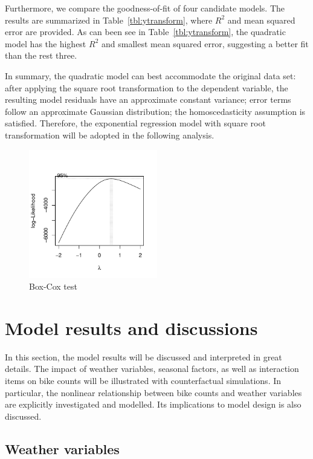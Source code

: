 \documentclass [11pt, proquest] {uwthesis}[2015/03/03]
\begin{document}
Furthermore, we compare the goodness-of-fit of four candidate models. The results are summarized in Table~\ref{tbl:ytransform}, where $R^2$ and mean squared error are provided. As can been see in Table~\ref{tbl:ytransform}, the quadratic model has the highest $R^2$ and smallest mean squared error, suggesting a better fit than the rest three.

In summary, the quadratic model can best accommodate the original data set: after applying the square root transformation to the dependent variable, the resulting model residuals have an approximate constant variance; error terms follow an approximate Gaussian distribution; the homoscedasticity assumption is satisfied. Therefore, the exponential regression model with square root transformation will be adopted in the following analysis. 

\begin{figure}
\centering
   \includegraphics[width=0.5\textwidth]{figures/boxcox} 
  \caption{Box-Cox test }
  \label{fig:boxcox}
\end{figure}

\section{Model results and discussions}

In this section, the model results will be discussed and interpreted in great details. The impact of weather variables, seasonal factors, as well as interaction items on bike counts will be illustrated with counterfactual simulations. In particular, the nonlinear relationship between bike counts and weather variables are explicitly investigated and modelled. Its implications to model design is also discussed. 

\subsection{Weather variables}
\end{document}
